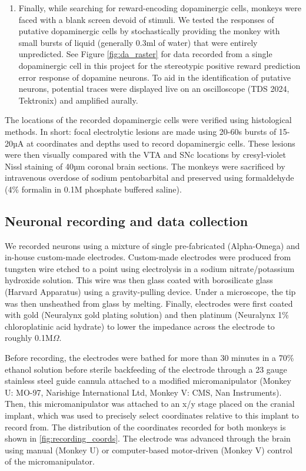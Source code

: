 \begin{enumerate}
    \item Finally, while searching for reward-encoding dopaminergic cells, monkeys were faced with a blank screen devoid of stimuli. We tested the responses of putative dopaminergic cells by stochastically providing the monkey with small bursts of liquid (generally 0.3ml of water) that were entirely unpredicted. See Figure \ref{fig:da_raster} for data recorded from a single dopaminergic cell in this project for the stereotypic positive reward prediction error response of dopamine neurons. To aid in the identification of putative neurons, potential traces were displayed live on an oscilloscope (TDS 2024, Tektronix) and amplified aurally.
\end{enumerate}

The locations of the recorded dopaminergic cells were verified using histological methods. In short: focal electrolytic lesions are made using 20-60s bursts of 15-20µA at coordinates and depths used to record dopaminergic cells. These lesions were then visually compared with the VTA and SNc locations by cresyl-violet Nissl staining of 40µm coronal brain sections. The monkeys were sacrificed by intravenous overdose of sodium pentobarbital and preserved using formaldehyde (4\% formalin in 0.1M phosphate buffered saline).

\subsection{Neuronal recording and data collection}
We recorded neurons using a mixture of single pre-fabricated (Alpha-Omega) and in-house custom-made electrodes. Custom-made electrodes were produced from tungsten wire etched to a point using electrolysis in a sodium nitrate/potassium hydroxide solution. This wire was then glass coated with borosilicate glass (Harvard Apparatus) using a gravity-pulling device. Under a microscope, the tip was then unsheathed from glass by melting. Finally, electrodes were first coated with gold (Neuralynx gold plating solution) and then platinum (Neuralynx 1\% chloroplatinic acid hydrate) to lower the impedance across the electrode to roughly 0.1M$\Omega$.

Before recording, the electrodes were bathed for more than 30 minutes in a 70\% ethanol solution before sterile backfeeding of the electrode through a 23 gauge stainless steel guide cannula attached to a modified micromanipulator (Monkey U: MO-97, Narishige International Ltd, Monkey V: CMS, Nan Instruments). Then, this micromanipulator was attached to an x/y stage placed on the cranial implant, which was used to precisely select coordinates relative to this implant to record from. The distribution of the coordinates recorded for both monkeys is shown in \ref{fig:recording_coords}. The electrode was advanced through the brain using manual (Monkey U) or computer-based motor-driven (Monkey V) control of the micromanipulator.

